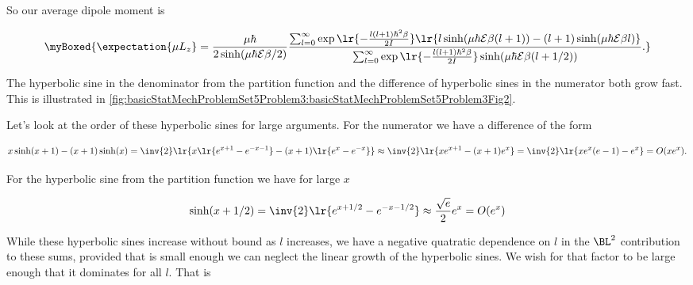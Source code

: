 {So our average dipole moment is 

\begin{equation}\label{eqn:basicStatMechProblemSet5Problem3:560}
\myBoxed{
\expectation{ \mu L_z } 
= 
\frac
{\mu \hbar }
{
2 \sinh(\mu \hbar \mathcal{E} \beta/2)
}
\frac
{
   \sum_{l = 0}^\infty \exp\lr{ -\frac{l (l+1) \hbar^2 \beta}{2 I}}
   \lr{ l \sinh(\mu \hbar \mathcal{E} \beta (l+1)) - (l+1) \sinh(\mu \hbar \mathcal{E} \beta l) }
}
{
   \sum_{l = 0}^\infty \exp\lr{ -\frac{l (l+1) \hbar^2 \beta}{2 I}} 
   \sinh(\mu \hbar \mathcal{E} \beta(l + 1/2))
}.
}
\end{equation}

The hyperbolic sine in the denominator from the partition function and the difference of hyperbolic sines in the numerator both grow fast.  This is illustrated in \cref{fig:basicStatMechProblemSet5Problem3:basicStatMechProblemSet5Problem3Fig2}.


Let's look at the order of these hyperbolic sines for large arguments.  For the numerator we have a difference of the form

\begin{dmath}\label{eqn:basicStatMechProblemSet5Problem3:580}
x \sinh( x + 1 ) - (x + 1) \sinh ( x )
= 
\inv{2} 
\lr{ 
x \lr{ e^{x + 1} - e^{-x - 1} }
-(x +1 )\lr{ e^{x } - e^{-x } }
}
\approx
\inv{2} 
\lr{ 
x e^{x + 1} 
-(x +1 ) e^{x } 
}
=
\inv{2} 
\lr{ 
x e^{x}  ( e - 1 ) - e^x
}
= O(x e^x).
\end{dmath}

For the hyperbolic sine from the partition function we have for large $x$ 

\begin{equation}\label{eqn:basicStatMechProblemSet5Problem3:600}
\sinh( x + 1/2) 
= \inv{2} \lr{e^{x + 1/2} - e^{-x - 1/2}}
\approx \frac{\sqrt{e}}{2} e^{x}
= O(e^x)
\end{equation}

%

While these hyperbolic sines increase without bound as $l$ increases, we have a negative quatratic dependence on $l$ in the $\BL^2$ contribution to these sums, provided that is small enough we can neglect the linear growth of the hyperbolic sines.  We wish for that factor to be large enough that it dominates for all $l$.  That is

}
